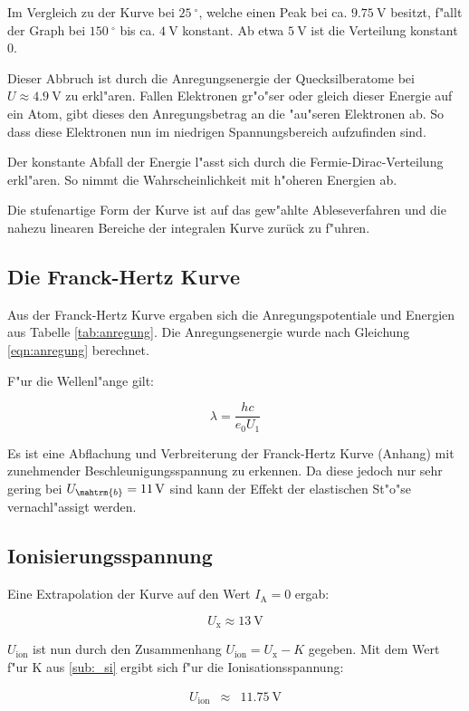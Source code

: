 Im Vergleich zu der Kurve bei $\SI{25}{^\circ}$, welche einen Peak bei ca. $\SI{9.75}{\volt}$ besitzt, f"allt der Graph bei $\SI{150}{^\circ}$ bis ca. $\SI{4}{\volt}$ konstant.
Ab etwa $\SI{5}{\volt}$ ist die Verteilung konstant $0$.

Dieser Abbruch ist durch die Anregungsenergie der Quecksilberatome bei $U \approx \SI{4.9}{\volt}$ zu erkl"aren.
Fallen Elektronen gr"o"ser oder gleich dieser Energie auf ein Atom, gibt dieses den Anregungsbetrag an die "au"seren Elektronen ab. So dass diese Elektronen nun im niedrigen Spannungsbereich aufzufinden sind.

Der konstante Abfall der Energie l"asst sich durch die Fermie-Dirac-Verteilung erkl"aren. So nimmt die Wahrscheinlichkeit mit h"oheren Energien ab.

Die stufenartige Form der Kurve ist auf das gew"ahlte Ableseverfahren und die nahezu linearen Bereiche der integralen Kurve zurück zu f"uhren.

\subsection{Die Franck-Hertz Kurve} %
\label{sub:die_franck_hertz_kurve}



Aus der Franck-Hertz Kurve ergaben sich die Anregungspotentiale und Energien aus Tabelle \ref{tab:anregung}. Die Anregungsenergie wurde nach Gleichung \eqref{eqn:anregung} berechnet.

F"ur die Wellenl"ange gilt:

\begin{equation}
	\lambda = \frac{h c}{e_\mathrm{0} U_\mathrm{1}}
\end{equation}

Es ist eine Abflachung und Verbreiterung der Franck-Hertz Kurve (Anhang) mit zunehmender Beschleunigungsspannung zu erkennen. Da diese jedoch nur sehr gering bei $U_\mahtrm{b} = \SI{11}{\volt}$ sind kann der Effekt der elastischen St"o"se vernachl"assigt werden.

\subsection{Ionisierungsspannung} %
\label{sub:ionisierungsspannung}

Eine Extrapolation der Kurve auf den Wert $I_\mathrm{A} = 0$ ergab:

\begin{equation}
	U_\mathrm{x} \approx \SI{13}{\volt}
\end{equation}

$U_\mathrm{ion}$ ist nun durch den Zusammenhang $U_\mathrm{ion} = U_\mathrm{x} - K$ gegeben.
Mit dem Wert f"ur K aus \ref{sub:_si} ergibt sich f"ur die Ionisationsspannung:

\begin{eqnarray*}
	U_\mathrm{ion} &\approx& \SI{11.75}{\volt} \\
\end{eqnarray*}